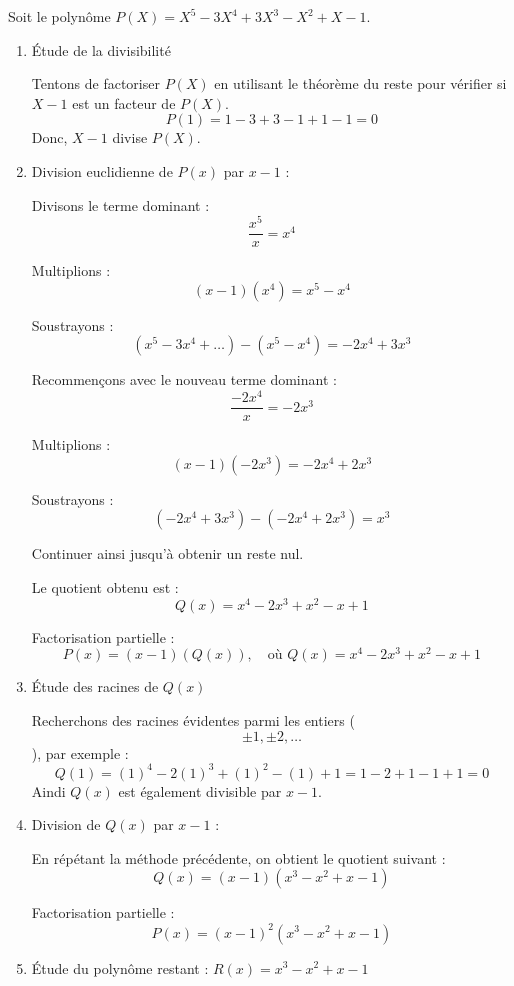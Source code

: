 \documentclass[10pt,a4paper]{article}
\begin{document}
\q Soit le polynôme \( P(X) = X^5 - 3X^4 + 3X^3 - X^2 + X - 1 \).
\begin{enumerate}
    \item Étude de la divisibilité

    Tentons de factoriser \( P(X) \) en utilisant le théorème du reste pour vérifier si \( X - 1 \)
    est un facteur de \( P(X) \).
    \[
    P(1) = 1 - 3 + 3 - 1 + 1 - 1 = 0
    \]
    Donc, \( X - 1 \) divise \( P(X) \).

    \item Division euclidienne de $ P(x) $ par $ x - 1 $ :

    Divisons le terme dominant :
    $$ \frac{x^5}{x} = x^4 $$

    Multiplions :
    $$ (x - 1)(x^4) = x^5 - x^4 $$

    Soustrayons :
    $$ (x^5 - 3x^4 + \dots) - (x^5 - x^4) = -2x^4 + 3x^3 $$

    Recommençons avec le nouveau terme dominant :
    $$ \frac{-2x^4}{x} = -2x^3 $$

    Multiplions :
    $$ (x - 1)(-2x^3) = -2x^4 + 2x^3 $$

    Soustrayons :
    $$ (-2x^4 + 3x^3) - (-2x^4 + 2x^3) = x^3 $$

    Continuer ainsi jusqu'à obtenir un reste nul.

    Le quotient obtenu est :
    $$
    Q(x) = x^4 - 2x^3 + x^2 - x + 1
    $$

    Factorisation partielle :
    $$
    P(x) = (x - 1)(Q(x)),
    \quad \text{où } Q(x) = x^4 - 2x^3 + x^2 - x + 1
    $$

    \item Étude des racines de $ Q(x) $

    Recherchons des racines évidentes parmi les entiers ($$ \pm 1, \pm 2, \dots $$), par exemple :
    $$
    Q(1) = (1)^4 - 2(1)^3 + (1)^2 - (1) + 1 = 1 - 2 + 1 - 1 + 1 = 0
    $$
    Aindi $ Q(x) $ est également divisible par $ x - 1 $.

    \item Division de $ Q(x) $ par $ x - 1 $ :

    En répétant la méthode précédente, on obtient le quotient suivant :
    $$
    Q(x) = (x-1)(x^3-x^2+x-1)
    $$

    Factorisation partielle :
    $$
    P(x) = (x-1)^2(x^3-x^2+x-1)
    $$

    \item Étude du polynôme restant : $ R(x) = x^3-x^2+x-1 $


\end{enumerate}
\end{document}
